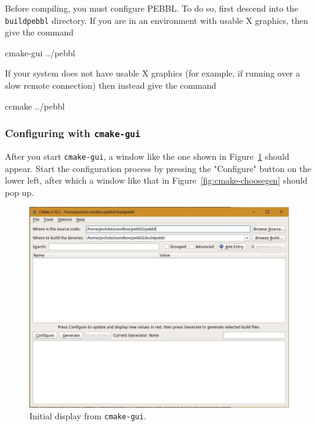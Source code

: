 Before compiling, you must configure PEBBL.  To do so, first descend into the
\texttt{buildpebbl} directory.  If you are in an environment with usable X
graphics, then give the command
\begin{codeblock}
cmake-gui ../pebbl
\end{codeblock}
If your system does not have usable X graphics (for example, if running over a
slow remote connection) then instead give the command
\begin{codeblock}
ccmake ../pebbl
\end{codeblock}

\subsubsection{Configuring with \texttt{cmake-gui}}
After you start \texttt{cmake-gui}, a window like the one shown in
Figure~\ref{fig:cmake1} should appear.  Start the configuration process by
pressing the "Configure" button on the lower left, after which a window like
that in Figure~\ref{fig:cmake-choosegen} should pop up.

\begin{figure}[tpb]
\begin{center}
\includegraphics[height=0.45\textheight]{cmake1}
\vspace{-0.3in}
\end{center}
\caption{Initial display from \texttt{cmake-gui}.\label{fig:cmake1}}
\end{figure}

